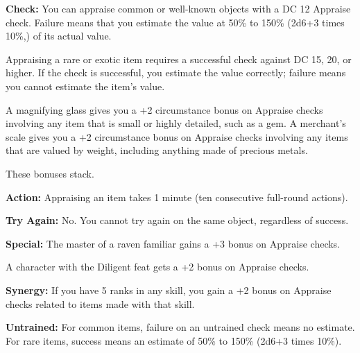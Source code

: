 \textbf{Check:} You can appraise common or well-known objects with a DC 12 Appraise check. Failure means that you estimate the value at 50\% to 150\% (2d6+3 times 10\%,) of its actual value.

Appraising a rare or exotic item requires a successful check against DC 15, 20, or higher. If the check is successful, you estimate the value correctly; failure means you cannot estimate the item's value.

A magnifying glass gives you a +2 circumstance bonus on Appraise checks involving any item that is small or highly detailed, such as a gem. A merchant's scale gives you a +2 circumstance bonus on Appraise checks involving any items that are valued by weight, including anything made of precious metals.

These bonuses stack.

\textbf{Action:} Appraising an item takes 1 minute (ten consecutive full-round actions).

\textbf{Try Again:} No. You cannot try again on the same object, regardless of success.

\textbf{Special:} The master of a raven familiar gains a +3 bonus on Appraise checks.

A character with the Diligent feat gets a +2 bonus on Appraise checks.

\textbf{Synergy:} If you have 5 ranks in any  skill, you gain a +2 bonus on Appraise checks related to items made with that  skill.

\textbf{Untrained:} For common items, failure on an untrained check means no estimate. For rare items, success means an estimate of 50\% to 150\% (2d6+3 times 10\%).